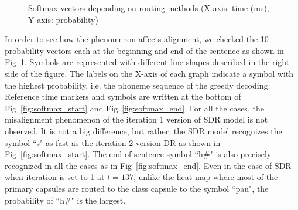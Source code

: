 \documentclass[review]{elsarticle}
\begin{document}
\begin{figure}[ht]
\centering
{}
\qquad
{}
\caption[]{Softmax vectors depending on routing methods (X-axis: time (ms), Y-axis: probability)}
\label{fig:softmax_output}
\end{figure}

In order to see how the phenomenon affects alignment, we checked the 10 probability vectors each at the beginning and end of the sentence as shown in Fig~\ref{fig:softmax_output}.
Symbols are represented with different line shapes described in the right side of the figure.
The labels on the X-axis of each graph indicate a symbol with the highest probability, i.e. the phoneme sequence of the greedy decoding.
Reference time markers and symbols are written at the bottom of Fig~\ref{fig:softmax_start} and Fig~\ref{fig:softmax_end}.
For all the cases, the misalignment phenomenon of the iteration 1 version of SDR model is not observed.
It is not a big difference, but rather, the SDR model recognizes the symbol ``s" as fast as the iteration 2 version DR as shown in Fig~\ref{fig:softmax_start}.
The end of sentence symbol ``h\#" is also precisely recognized in all the cases as in Fig~\ref{fig:softmax_end}.
Even in the case of SDR when iteration is set to 1 at $t=137$, unlike the heat map where most of the primary capsules are routed  to the class capsule to the symbol ``pau", the probability of ``h\#" is the largest.
\end{document}
